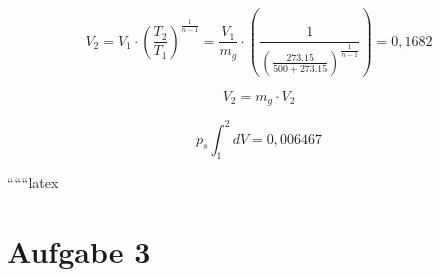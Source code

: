 \begin{equation*}
V_2 = V_1 \cdot \left( \frac{T_2}{T_1} \right)^{\frac{1}{n-1}} = \frac{V_1}{m_g} \cdot \left( \frac{1}{\left( \frac{273.15}{500 + 273.15} \right)^{\frac{1}{n-1}}} \right) = 0,1682
\end{equation*}

\begin{equation*}
V_2 = m_g \cdot V_2
\end{equation*}

\begin{equation*}
p_s \int_1^2 dV = 0,006467
\end{equation*}

``````latex


\section*{Aufgabe 3}